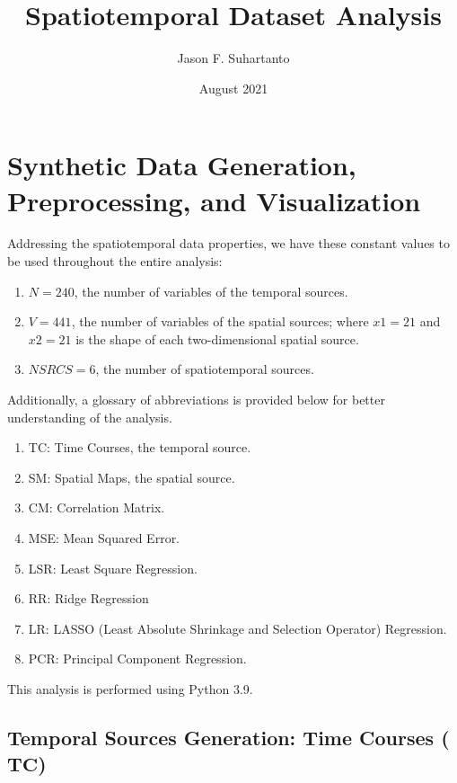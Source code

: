 \documentclass[11pt]{article}
\title{\textbf{Spatiotemporal Dataset Analysis}}
\author{Jason F. Suhartanto}
\date{August 2021}
\begin{document}
\maketitle

\section{Synthetic Data Generation, Preprocessing, and Visualization}

Addressing the spatiotemporal data properties, we have these constant values to be used throughout the entire analysis:


\begin{enumerate}
    \item $N = 240$, the number of variables of the temporal sources. 
    \item $V = 441$, the number of variables of the spatial sources; where $x1 = 21$ and $x2 = 21$ is the shape of each two-dimensional spatial source.
    \item $NSRCS = 6$, the number of spatiotemporal sources.
\end{enumerate}

Additionally, a glossary of abbreviations is provided below for better understanding of the analysis.

\begin{enumerate}
    \item TC: Time Courses, the temporal source.
    \item SM: Spatial Maps, the spatial source.
    \item CM: Correlation Matrix.
    \item MSE: Mean Squared Error.
    \item LSR: Least Square Regression.
    \item RR: Ridge Regression
    \item LR: LASSO (Least Absolute Shrinkage and Selection Operator) Regression.
    \item PCR: Principal Component Regression.
\end{enumerate}

This analysis is performed using Python 3.9.

\subsection{Temporal Sources Generation: Time Courses ($\mathbf{TC}$)}
\end{document}
